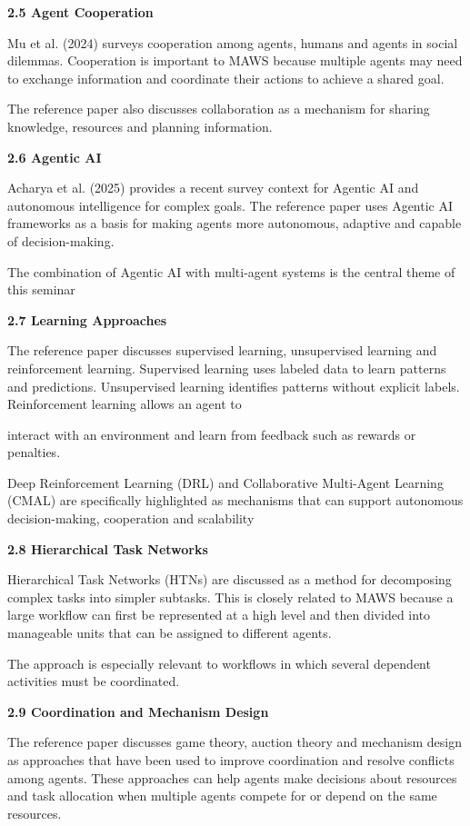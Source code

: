 \documentclass[12pt,letterpaper]{article}
\newcommand{\sectiontitle}[1]{%
  \vspace{6pt}%
  {\noindent\fontsize{13.2pt}{16pt}\selectfont\bfseries #1\par}%
  \vspace{2pt}%
}
\begin{document}
\sectiontitle{2.5 Agent Cooperation}
Mu et al. (2024) surveys cooperation among agents, humans and agents in social dilemmas. Cooperation is important to MAWS because multiple agents may need to exchange information and coordinate their actions to achieve a shared goal.

The reference paper also discusses collaboration as a mechanism for sharing knowledge, resources and planning information.

\sectiontitle{2.6 Agentic AI}
Acharya et al. (2025) provides a recent survey context for Agentic AI and autonomous intelligence for complex goals. The reference paper uses Agentic AI frameworks as a basis for making agents more autonomous, adaptive and capable of decision-making.

The combination of Agentic AI with multi-agent systems is the central theme of this seminar

\sectiontitle{2.7 Learning Approaches}
The reference paper discusses supervised learning, unsupervised learning and reinforcement learning. Supervised learning uses labeled data to learn patterns and predictions. Unsupervised learning identifies patterns without explicit labels. Reinforcement learning allows an agent to
\newpage

interact with an environment and learn from feedback such as rewards or penalties.

Deep Reinforcement Learning (DRL) and Collaborative Multi-Agent Learning (CMAL) are specifically highlighted as mechanisms that can support autonomous decision-making, cooperation and scalability

\sectiontitle{2.8 Hierarchical Task Networks}
Hierarchical Task Networks (HTNs) are discussed as a method for decomposing complex tasks into simpler subtasks. This is closely related to MAWS because a large workflow can first be represented at a high level and then divided into manageable units that can be assigned to different agents.

The approach is especially relevant to workflows in which several dependent activities must be coordinated.

\sectiontitle{2.9 Coordination and Mechanism Design}
The reference paper discusses game theory, auction theory and mechanism design as approaches that have been used to improve coordination and resolve conflicts among agents. These approaches can help agents make decisions about resources and task allocation when multiple agents compete for or depend on the same resources.
\end{document}

